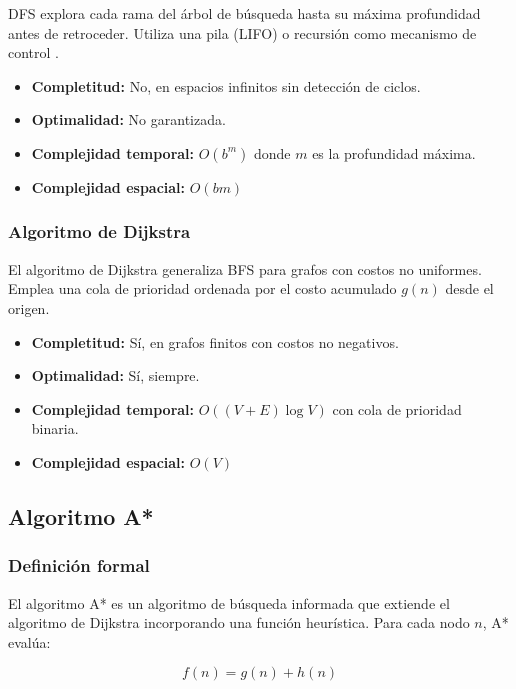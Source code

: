 DFS explora cada rama del árbol de búsqueda hasta su máxima profundidad antes de retroceder. Utiliza una pila (LIFO) o recursión como mecanismo de control \cite{cormen2022introduction}.

\begin{itemize}
    \item \textbf{Completitud:} No, en espacios infinitos sin detección de ciclos.
    \item \textbf{Optimalidad:} No garantizada.
    \item \textbf{Complejidad temporal:} $O(b^m)$ donde $m$ es la profundidad máxima.
    \item \textbf{Complejidad espacial:} $O(bm)$
\end{itemize}

\subsubsection{Algoritmo de Dijkstra}

El algoritmo de Dijkstra \cite{dijkstra1959note} generaliza BFS para grafos con costos no uniformes. Emplea una cola de prioridad ordenada por el costo acumulado $g(n)$ desde el origen.

\begin{itemize}
    \item \textbf{Completitud:} Sí, en grafos finitos con costos no negativos.
    \item \textbf{Optimalidad:} Sí, siempre.
    \item \textbf{Complejidad temporal:} $O((V + E) \log V)$ con cola de prioridad binaria.
    \item \textbf{Complejidad espacial:} $O(V)$
\end{itemize}

\subsection{Algoritmo A*}

\subsubsection{Definición formal}

El algoritmo A* \cite{hart1968formal} es un algoritmo de búsqueda informada que extiende el algoritmo de Dijkstra incorporando una función heurística. Para cada nodo $n$, A* evalúa:

\begin{equation}
    f(n) = g(n) + h(n)
    \label{eq:astar}
\end{equation}

